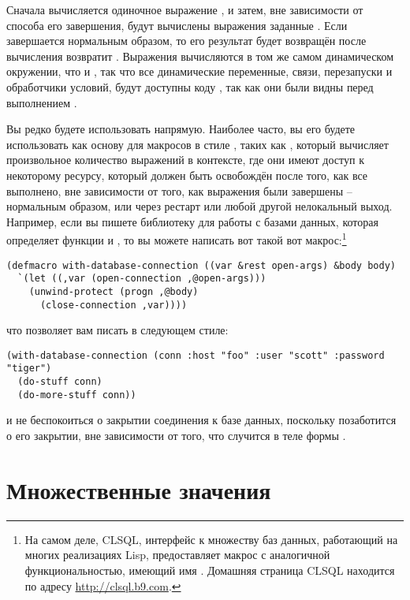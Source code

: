 Сначала вычисляется одиночное выражение , и затем, вне зависимости от
способа его завершения, будут вычислены выражения заданные .  Если
 завершается нормальным образом, то его результат будет возвращён
 после вычисления возвратит . Выражения
 вычисляются в том же самом динамическом окружении, что и
, так что все динамические переменные, связи, перезапуски и
обработчики условий, будут доступны коду , так как они были видны
перед выполнением .

Вы редко будете использовать  напрямую.  Наиболее часто, вы его
будете использовать как основу для макросов в стиле , таких как
, который вычисляет произвольное количество выражений в контексте,
где они имеют доступ к некоторому ресурсу, который должен быть освобождён после того, как
все выполнено, вне зависимости от того, как выражения были завершены -- нормальным
образом, или через рестарт или любой другой нелокальный выход.  Например, если вы пишете
библиотеку для работы с базами данных, которая определяет функции  и
, то вы можете написать вот такой вот макрос:\footnote{На самом
  деле, CLSQL, интерфейс к множеству баз данных, работающий на многих реализациях Lisp,
  предоставляет макрос с аналогичной функциональностью, имеющий имя .
  Домашняя страница CLSQL находится по адресу \url{http://clsql.b9.com}.}

\begin{lstlisting}
(defmacro with-database-connection ((var &rest open-args) &body body)
  `(let ((,var (open-connection ,@open-args)))
    (unwind-protect (progn ,@body)
      (close-connection ,var))))
\end{lstlisting}

что позволяет вам писать в следующем стиле:

\begin{lstlisting}
(with-database-connection (conn :host "foo" :user "scott" :password "tiger")
  (do-stuff conn)
  (do-more-stuff conn))
\end{lstlisting}

и не беспокоиться о закрытии соединения к базе данных, поскольку 
позаботится о его закрытии, вне зависимости от того, что случится в теле формы
.

\section{Множественные значения}

